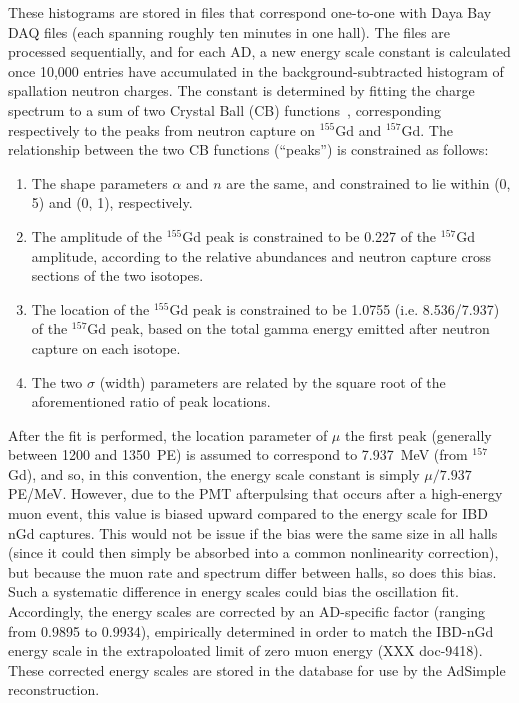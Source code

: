 \documentclass[../thesis.tex]{subfiles}
\begin{document}
\begin{comment}
  Note: For AdSimpleNL, in reconstruction, a (AD-specific?) scale constant is applied to the non-NL energy scale constant. See line 209 of QsumEnergyTool.cc. Discuss this?
\end{comment}

These histograms are stored in files that correspond one-to-one with Daya Bay DAQ files (each spanning roughly ten minutes in one hall). The files are processed sequentially, and for each AD, a new energy scale constant is calculated once 10,000 entries have accumulated in the background-subtracted histogram of spallation neutron charges. The constant is determined by fitting the charge spectrum to a sum of two Crystal Ball (CB) functions~\cite{cbfunction}, corresponding respectively to the peaks from neutron capture on $^{155}$Gd and $^{157}$Gd. The relationship between the two CB functions (``peaks'') is constrained as follows:

\begin{enumerate}
\item The shape parameters $\alpha$ and $n$ are the same, and constrained to lie within (0, 5) and (0, 1), respectively.
\item The amplitude of the $^{155}$Gd peak is constrained to be 0.227 of the $^{157}$Gd amplitude, according to the relative abundances and neutron capture cross sections of the two isotopes.
\item The location of the $^{155}$Gd peak is constrained to be 1.0755 (i.e. 8.536/7.937) of the $^{157}$Gd peak, based on the total gamma energy emitted after neutron capture on each isotope.
\item The two $\sigma$ (width) parameters are related by the square root of the aforementioned ratio of peak locations.
\end{enumerate}

After the fit is performed, the location parameter of $\mu$ the first peak (generally between 1200 and 1350~PE) is assumed to correspond to 7.937~MeV (from $^{157}$Gd), and so, in this convention, the energy scale constant is simply $\mu/7.937$ PE/MeV. However, due to the PMT afterpulsing that occurs after a high-energy muon event, this value is biased upward compared to the energy scale for IBD nGd captures. This would not be issue if the bias were the same size in all halls (since it could then simply be absorbed into a common nonlinearity correction), but because the muon rate and spectrum differ between halls, so does this bias. Such a systematic difference in energy scales could bias the oscillation fit. Accordingly, the energy scales are corrected by an AD-specific factor (ranging from 0.9895 to 0.9934), empirically determined in order to match the IBD-nGd energy scale in the extrapoloated limit of zero muon energy (XXX doc-9418). These corrected energy scales are stored in the database for use by the AdSimple reconstruction.
\end{document}
